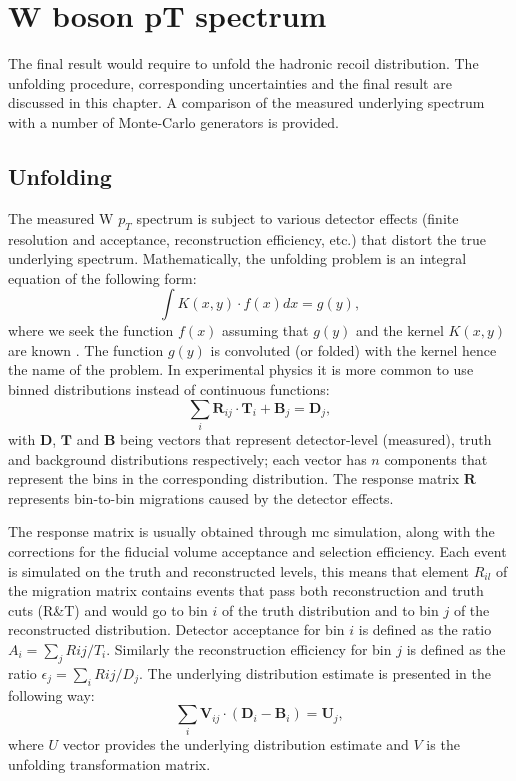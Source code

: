 \chapter{W boson pT spectrum}
The final result would require to unfold the hadronic recoil distribution. The unfolding procedure, corresponding uncertainties and the final result are discussed in this chapter. A comparison of the measured underlying spectrum with a number of Monte-Carlo generators is provided. 
\section{Unfolding}
The measured W $p_T$ spectrum is subject to various detector effects (finite resolution and acceptance, reconstruction efficiency, etc.) that distort the true underlying spectrum. Mathematically, the unfolding problem is an integral equation of the following form:
\begin{equation}
	\int K(x,y)\cdot f(x)dx = g(y),
\end{equation}
where we seek the function $f(x)$ assuming that $g(y)$ and the kernel $K(x,y)$ are known \cite{Schmitt:2016orm}. The function $g(y)$ is convoluted (or folded) with the kernel hence the name of the problem. In experimental physics it is more common to use binned distributions instead of continuous functions: 
\begin{equation}
\sum_{i} \textbf{R}_{ij}\cdot \textbf{T}_i + \textbf{B}_j = \textbf{D}_j,
\end{equation}
with $\textbf{D}$, $\textbf{T}$ and $\textbf{B}$ being vectors that represent detector-level (measured), truth and background distributions respectively; each vector has $n$ components that represent the bins in the corresponding distribution. The response matrix $\textbf{R}$ represents bin-to-bin migrations caused by the detector effects. 

The response matrix is usually obtained through \gls{mc} simulation, along with the corrections for the fiducial volume acceptance and selection efficiency. Each event is simulated on the truth and reconstructed levels, this means that element $R_{il}$ of the migration matrix contains events that pass both reconstruction and truth cuts (R\&T) and would go to bin $i$ of the truth distribution and to bin $j$ of the reconstructed distribution. Detector acceptance for bin $i$ is defined as the ratio $A_i=\sum_j R{ij}/T_i$. Similarly the reconstruction efficiency for bin $j$ is defined as the ratio $\epsilon_j=\sum_i R{ij}/D_j$.
The underlying distribution estimate is presented in the following way:
\begin{equation}
\sum_{i} \textbf{V}_{ij}\cdot (\textbf{D}_i - \textbf{B}_i) = \textbf{U}_j,
\end{equation}
 where $U$ vector provides the underlying distribution estimate and $V$ is the unfolding transformation matrix.
 

